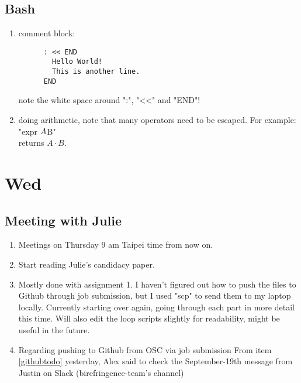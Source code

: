 \documentclass[12pt,letterpaper]{article}
\begin{document}
\subsection{Bash}
\begin{enumerate}
  \item comment block:
    \begin{verbatim}
      : << END
        Hello World!
        This is another line.
      END
    \end{verbatim}
    note the white space around ":", "<<" and "END"!

  \item doing arithmetic, note that many operators need to be escaped. For example:\\
    "expr $A \* $B"\\
    returns $A\cdot B$.
    
\end{enumerate}


\section{Wed}
\subsection{Meeting with Julie}
\begin{enumerate}
  \item Meetings on Thursday 9 am Taipei time from now on.
  \item Start reading Julie's candidacy paper.
  \item Mostly done with assignment 1. I haven't figured out how to push the files
    to Github through job submission, but I used "scp" to send them to my laptop
    locally. Currently starting over again, going through each part in more detail
    this time. Will also edit the loop scripts slightly for readability, might be 
    useful in the future.
  \item 
    Regarding pushing to Github from OSC via job submission From item
    \ref{githubtodo} yesterday, Alex said to check the September-19th message
    from Justin on Slack (birefringence-team's channel)
\end{enumerate}
\end{document}
